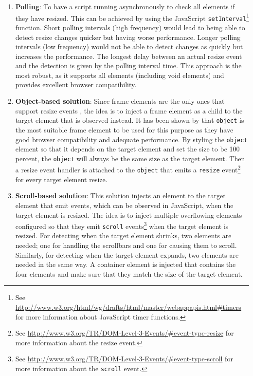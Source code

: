 \documentclass[a4paper,11pt]{kth-mag}
\newcommand{\code}[1]{\texttt{#1}}
\begin{document}
        \begin{enumerate}
          \item\label{itm:erd-approach-polling}
            \textbf{Polling}:
            To have a script running asynchronously to check all \glspl{element} if they have resized.
            This can be achieved by using the \gls{JavaScript} \code{setInterval}\footnote{See \url{http://www.w3.org/html/wg/drafts/html/master/webappapis.html\#timers} for more information about \gls{JavaScript} timer functions.} function.
            Short polling intervals (high frequency) would lead to being able to detect resize changes quicker but having worse performance.
            Longer polling intervals (low frequency) would not be able to detect changes as quickly but increases the performance.
            The longest delay between an actual resize event and the detection is given by the polling interval time.
            This approach is the most robust, as it supports all elements (including void elements) and provides excellent browser compatibility.
          \item\label{itm:erd-approach-object}
            \textbf{Object-based solution}:
            Since frame \glspl{element} are the only ones that support resize events , the idea is to inject a frame \gls{element} as a child to the target \gls{element} that is observed instead.
            It has been shown by \cite{backalley} that \code{object} is the most suitable frame \gls{element} to be used for this purpose as they have good \gls{browser} compatibility and adequate performance.
            By styling the \code{object} element so that it depends on the target \gls{element} and set the size to be 100 percent, the \code{object} will always be the same size as the target element.
            Then a resize event handler is attached to the \code{object} that emits a \code{resize} event\footnote{See \url{http://www.w3.org/TR/DOM-Level-3-Events/\#event-type-resize} for more information about the resize event.} for every target \gls{element} resize.
          \item\label{itm:erd-approach-scroll}
            \textbf{Scroll-based solution}:
            This solution injects an \gls{element} to the target element that emit events, which can be observed in JavaScript, when the target element is resized.
            The idea is to inject multiple overflowing elements configured so that they emit \code{scroll} events\footnote{See \url{http://www.w3.org/TR/DOM-Level-3-Events/\#event-type-scroll} for more information about the \code{scroll} event.} when the target element is resized.
            For detecting when the target \gls{element} shrinks, two \glspl{element} are needed; one for handling the scrollbars and one for causing them to scroll.
            Similarly, for detecting when the target \gls{element} expands, two \glspl{element} are needed in the same way.
            A container \gls{element} is injected that contains the four \glspl{element} and make sure that they match the size of the target element.
        \end{enumerate}
\end{document}
